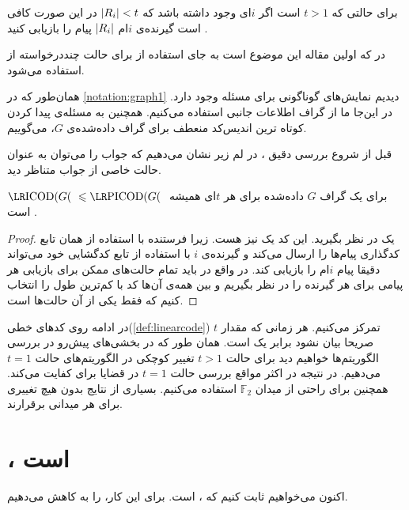\begin{note}
    برای حالتی که
    $t > 1$
    است اگر
    $i$ای وجود داشته باشد که
    $\left|{R_i}\right| < t$
    در این صورت کافی است گیرنده‌ی
    $i$ام
    $\left|{R_i}\right|$
    پیام را بازیابی کنید \cite{pliablefirstpaper}.
\end{note}

\begin{note}
    در
    \cite{pliablefirstpaper}
    که اولین مقاله این موضوع است به جای استفاده از
    \picodt
    برای حالت چنددرخواسته از
    استفاده می‌شود.
\end{note}
\begin{notation}
    همان‌طور که در
    \autoref{notation:graph1}
    دیدیم نمایش‌های گوناگونی برای مسئله وجود دارد. در این‌جا ما از گراف اطلاعات جانبی استفاده می‌کنیم. همچنین به مسئله‌ی پیدا کردن کوتاه ترین اندیس‌کد منعطف برای گراف داده‌شده‌ی
    $G$،
    \picodg
    می‌گوییم.
\end{notation}

قبل از شروع بررسی دقیق \picod، در لم زیر نشان می‌دهیم که جواب \picod را می‌توان به عنوان حالت خاصی از جواب \icod متناظر دید.
\begin{lemma}
    برای یک گراف
    $G$
    داده‌شده برای هر
    $t$ای همیشه
    $\icodg \leq \picodg$
    است \cite{pliablefirstpaper}.
\end{lemma}
\begin{proof}
    یک
    \icod
    در نظر بگیرید. این کد یک
    \picod
    نیز هست. زیرا فرستنده با استفاده از همان تابع کدگذاری پیام‌ها را ارسال می‌کند و گیرنده‌ی
    $i$
    با استفاده از تابع کدگشایی خود می‌تواند دقیقا پیام
    $i$ام را بازیابی کند. در واقع در
    \picod
    باید تمام حالت‌های ممکن برای بازیابی هر پیامی برای هر گیرنده را در نظر بگیریم و بین همه‌ی آن‌ها کد با کم‌ترین طول را انتخاب کنیم که
    \icod
    فقط یکی از آن حالت‌ها است.
\end{proof}


در ادامه روی کدهای خطی(\autoref{def:linearcode}) تمرکز می‌کنیم. هر زمانی که مقدار
$t$
صریحا بیان نشود برابر یک است. همان طور که در بخشی‌های پیش‌رو در بررسی الگوریتم‌ها خواهیم دید برای حالت
$t > 1$
تغییر کوچکی در الگوریتم‌های حالت
$t = 1$
می‌دهیم. در نتیجه در اکثر مواقع بررسی حالت
$t = 1$
در قضایا برای کفایت می‌کند. همچنین برای راحتی از میدان
$\mathbb{F}_2$
استفاده می‌کنیم. بسیاری از نتایج بدون هیچ تغییری برای هر میدانی برقرارند.

\section{\lpicod،
\nphard
است}
اکنون می‌خواهیم ثابت کنیم که
،
\nphard
است. برای این کار،
\lpicod
را به
کاهش می‌دهیم.

